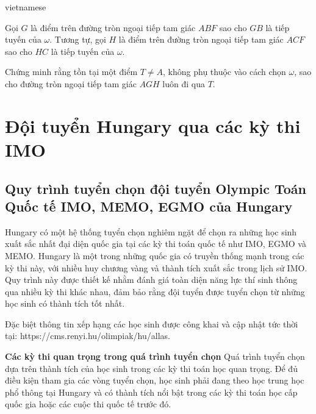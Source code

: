 \documentclass{article}
\begin{document}
\begin{otherlanguage*}{vietnamese}
\begin{problem*}[2024, bài 3]
    Gọi \( G \) là điểm trên đường tròn ngoại tiếp tam giác \( ABF \) sao cho \( GB \) là tiếp tuyến của \( \omega \).
    Tương tự, gọi \( H \) là điểm trên đường tròn ngoại tiếp tam giác \( ACF \) sao cho \( HC \) là tiếp tuyến của \( \omega \).  
    
    Chứng minh rằng tồn tại một điểm \( T \neq A \), không phụ thuộc vào cách chọn \( \omega \), sao cho đường tròn ngoại tiếp tam giác \( AGH \) luôn đi qua \( T \).
\end{problem*}

\newpage

\section{Đội tuyển Hungary qua các kỳ thi IMO}

\subsection{Quy trình tuyển chọn đội tuyển Olympic Toán Quốc tế IMO, MEMO, EGMO của Hungary}

Hungary có một hệ thống tuyển chọn nghiêm ngặt để chọn ra những học sinh xuất sắc nhất đại diện quốc gia tại các kỳ thi toán quốc tế như IMO, EGMO và MEMO.
Hungary là một trong những quốc gia có truyền thống mạnh trong các kỳ thi này, với nhiều huy chương vàng và thành tích xuất sắc trong lịch sử IMO.
Quy trình này được thiết kế nhằm đánh giá toàn diện năng lực thí sinh thông qua nhiều kỳ thi khác nhau, đảm bảo rằng đội tuyển được tuyển chọn từ những học sinh có thành tích tốt nhất.

Đặc biệt thông tin xếp hạng các học sinh được công khai và cập nhật tức thời tại: https://cms.renyi.hu/olimpiak/hu/allas.

\textbf{Các kỳ thi quan trọng trong quá trình tuyển chọn}
Quá trình tuyển chọn dựa trên thành tích của học sinh trong các kỳ thi toán học quan trọng. Để đủ điều kiện tham gia các vòng tuyển chọn,
học sinh phải đang theo học trung học phổ thông tại Hungary và có thành tích nổi bật trong các kỳ thi toán học cấp quốc gia hoặc các cuộc thi quốc tế trước đó.


\end{otherlanguage*}
\end{document}
